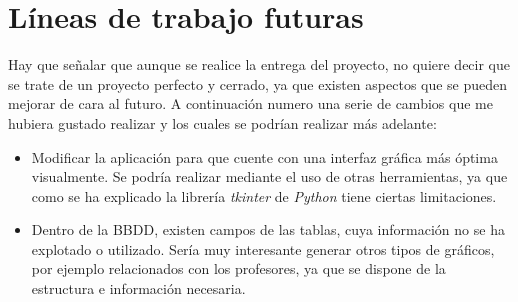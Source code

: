 \section{Líneas de trabajo futuras}\label{lineas_de_trabajo_futuras}

Hay que señalar que aunque se realice la entrega del proyecto, no quiere decir que se trate de un proyecto perfecto y cerrado, ya que existen aspectos que se pueden mejorar de cara al futuro. A continuación numero una serie de cambios que me hubiera gustado realizar y los cuales se podrían realizar más adelante:


\begin{itemize}

\item Modificar la aplicación para que cuente con una interfaz gráfica más óptima visualmente. Se podría realizar mediante el uso de otras herramientas, ya que como se ha explicado la librería \emph{tkinter} de \emph{Python} tiene ciertas limitaciones.

\item Dentro de la BBDD, existen campos de las tablas, cuya información no se ha explotado o utilizado. Sería muy interesante generar otros tipos de gráficos, por ejemplo relacionados con los profesores, ya que se dispone de la estructura e información necesaria.
 
\end{itemize}